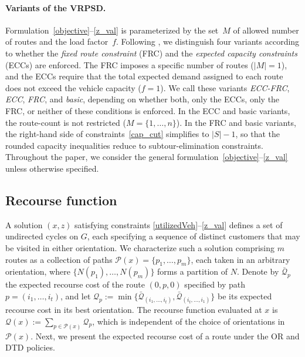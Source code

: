 \documentclass{article}
\newcommand{\rev}[1]{{\color{black}#1}}
\begin{document}
\rev{\paragraph{Variants of the VRPSD.}
Formulation~\eqref{objective}--\eqref{z_val} is parameterized by the set~$M$ of allowed number of routes and the load factor~$f$. Following \cite{hoogendoorn2025evaluation}, we distinguish four variants according to whether the \emph{fixed route constraint} (FRC) and the \emph{expected capacity constraints} (ECCs) are enforced. The FRC imposes a specific number of routes ($|M|=1$), and the ECCs require that the total expected demand assigned to each route does not exceed the vehicle capacity ($f=1$). We call these variants \emph{ECC-FRC}, \emph{ECC}, \emph{FRC}, and \emph{basic}, depending on whether both, only the ECCs, only the FRC, or neither of these conditions is enforced. In the ECC and basic variants, the route-count is not restricted ($M=\{1,\dots,n\}$). In the FRC and basic variants, the right-hand side of constraints~\eqref{cap_cut} simplifies to $|S|-1$, so that the rounded capacity inequalities reduce to subtour-elimination constraints. Throughout the paper, we consider the general formulation~\eqref{objective}--\eqref{z_val} unless otherwise specified. 
}

\subsection{Recourse function}\label{subsec:ExpRecCost}

\rev{A solution $(x,z)$ satisfying constraints \eqref{utilizedVeh}--\eqref{z_val}} defines a set of undirected cycles on $G$, each specifying a sequence of distinct customers that may be visited in either orientation. We characterize such a solution comprising $m$ routes as a collection of paths $\mathcal{P}(x) = \{p_1, \dots, p_m\}$, each taken in an arbitrary orientation, where $\{N(p_1), \dots, N(p_m)\}$ forms a partition of $N$. Denote by $\bar{\mathcal{Q}}_{p}$ the expected recourse cost of the route $(0,p,0)$ specified by path $p=(i_1,\dots,i_t)$, and let $\mathcal{Q}_{p} := \min\{\bar{\mathcal{Q}}_{(i_1,\dots,i_t)}, \bar{\mathcal{Q}}_{(i_t,\dots,i_1)}\}$ be its expected recourse cost in its best orientation. The recourse function evaluated at $x$ is $\mathcal{Q}(x) := \sum_{p \in \mathcal{P}(x)}\mathcal{Q}_p$, \rev{which is independent of the choice of orientations in $\mathcal{P}(x)$}. \rev{Next, we present the expected recourse cost of a route under the OR and DTD policies.}
 
\end{document}
